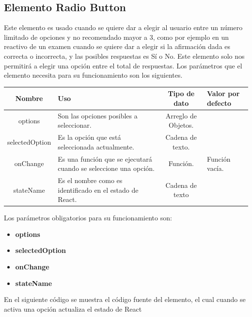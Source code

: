 \subsection{Elemento Radio Button}
Este elemento es usado cuando se quiere dar a elegir al usuario entre un número limitado de opciones y no recomendado mayor a 3, como por ejemplo en un reactivo de un examen cuando se quiere dar a elegir si la afirmación dada es correcta o incorrecta, y las posibles respuestas es Sí o No. Este elemento solo nos permitirá a elegir una opción entre el total de respuestas.
Los parámetros que el elemento necesita para su funcionamiento son los siguientes.
  \newline
    \newline
    \begin{center}
     \begin{tabular}{ | c |  p{5cm}  | c | p{3cm} |} 
     \hline
     \textbf{Nombre} &  \textbf{Uso} &  \textbf{ Tipo de dato} &  \textbf{Valor por defecto}\\ [0.5ex] 
     \hline\hline
     options &  Son las opciones posibles a seleccionar. &   Arreglo de Objetos. & \\  [2.5ex] 
     \hline
     selectedOption &  Es la opción que está seleccionada actualmente. &   Cadena de texto. & \\  [2.5ex] 
     \hline
     onChange &  Es una función que se ejecutará cuando se seleccione una opción. &   Función. & Función vacía. \\  [2.5ex] 
     \hline
     stateName &  Es el nombre como es identificado en el estado de React. &  Cadena de texto & \\  [2.5ex] 
     \hline
    \end{tabular}
    \end{center}
    \newline
        \newline
Los parámetros obligatorios para su funcionamiento son:
\begin{itemize}
\item \textbf{options} 
\item \textbf{selectedOption} 
\item \textbf{onChange} 
\item \textbf{stateName} 
\end{itemize}
\newline
    \newline
En el siguiente código se muestra el código fuente del elemento, el cual cuando se activa una opción actualiza el estado de React
